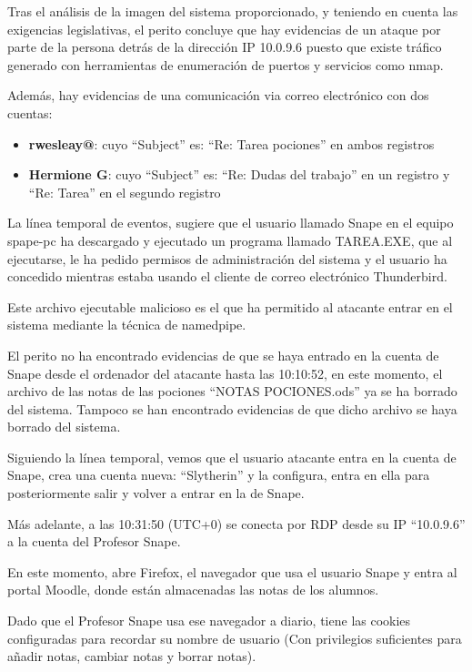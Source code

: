 Tras el análisis de la imagen del sistema proporcionado, y teniendo en cuenta las exigencias legislativas, el perito concluye que hay evidencias de un ataque por parte de la persona detrás de la dirección \gls{IP} 10.0.9.6 puesto que existe tráfico generado con herramientas de enumeración de puertos y servicios como \gls{nmap}. 

Además, hay evidencias de una comunicación via correo electrónico con dos cuentas:
\begin{itemize}
\item{\textbf{rwesleay@}: cuyo ``Subject'' es: ``Re: Tarea pociones'' en ambos registros}
\item{\textbf{Hermione G}: cuyo ``Subject'' es: ``Re: Dudas del trabajo'' en un registro y ``Re: Tarea'' en el segundo registro}
\end{itemize}

La línea temporal de eventos, sugiere que el usuario llamado Snape en el equipo spape-pc ha descargado y ejecutado un programa llamado TAREA.EXE, que al ejecutarse, le ha pedido permisos de administración del sistema y el usuario ha concedido mientras estaba usando el cliente de correo electrónico Thunderbird.

Este archivo ejecutable malicioso es el que ha permitido al atacante entrar en el sistema mediante la técnica de namedpipe.

El perito no ha encontrado evidencias de que se haya entrado en la cuenta de Snape desde el ordenador del atacante hasta las 10:10:52, en este momento, el archivo de las notas de las pociones ``NOTAS POCIONES.ods'' ya se ha borrado del sistema. Tampoco se han encontrado evidencias de que dicho archivo se haya borrado del sistema.

Siguiendo la línea temporal, vemos que el usuario atacante entra en la cuenta de Snape, crea una cuenta nueva: ``Slytherin'' y la configura, entra en ella para posteriormente salir y volver a entrar en la de Snape.

Más adelante, a las 10:31:50 (UTC+0) se conecta por \gls{RDP} desde su IP ``10.0.9.6'' a la cuenta del Profesor Snape.

En este momento, abre Firefox, el navegador que usa el usuario Snape y entra al portal Moodle, donde están almacenadas las notas de los alumnos. 

Dado que el Profesor Snape usa ese navegador a diario, tiene las cookies configuradas para recordar su nombre de usuario (Con privilegios suficientes para añadir notas, cambiar notas y borrar notas).

